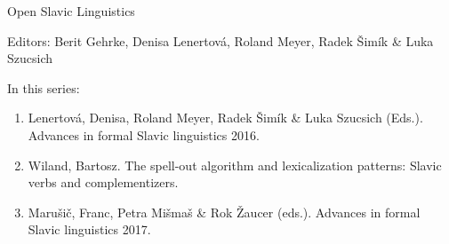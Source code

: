 {\large Open Slavic Linguistics}

\bigskip

Editors: Berit Gehrke,
         Denisa Lenertová, 
         Roland Meyer, 
         Radek Šimík \&  
         Luka Szucsich

\bigskip

In this series:

\begin{enumerate}
\item Lenertová, Denisa, Roland Meyer, Radek Šimík \& Luka Szucsich (Eds.). Advances in formal Slavic linguistics 2016.
\item Wiland, Bartosz. The spell-out algorithm and lexicalization patterns: Slavic verbs and complementizers.
\item Marušič, Franc, Petra Mišmaš  \& Rok Žaucer (eds.).  Advances in formal Slavic linguistics 2017.
  
\end{enumerate}
